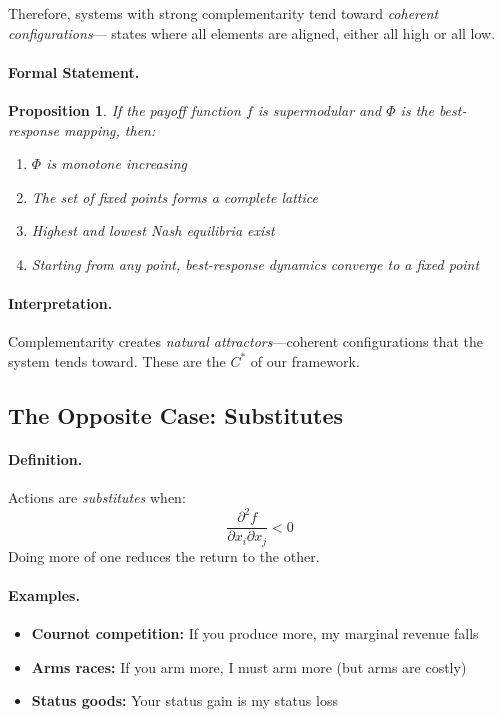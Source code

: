 \documentclass[12pt,a4paper]{article}
\newtheorem{proposition}[theorem]{Proposition}
\begin{document}
Therefore, systems with strong complementarity tend toward \emph{coherent configurations}---
states where all elements are aligned, either all high or all low.

\paragraph{Formal Statement.}
\begin{proposition}
If the payoff function $f$ is supermodular and $\Phi$ is the best-response mapping,
then:
\begin{enumerate}
  \item $\Phi$ is monotone increasing
  \item The set of fixed points forms a complete lattice
  \item Highest and lowest Nash equilibria exist
  \item Starting from any point, best-response dynamics converge to a fixed point
\end{enumerate}
\end{proposition}

\paragraph{Interpretation.}
Complementarity creates \emph{natural attractors}---coherent configurations
that the system tends toward. These are the $C^*$ of our framework.

\subsection{The Opposite Case: Substitutes}

\paragraph{Definition.}
Actions are \emph{substitutes} when:
\begin{equation}
  \frac{\partial^2 f}{\partial x_i \partial x_j} < 0
\end{equation}
Doing more of one reduces the return to the other.

\paragraph{Examples.}
\begin{itemize}
  \item \textbf{Cournot competition:} If you produce more, my marginal revenue falls
  \item \textbf{Arms races:} If you arm more, I must arm more (but arms are costly)
  \item \textbf{Status goods:} Your status gain is my status loss
\end{itemize}
\end{document}

